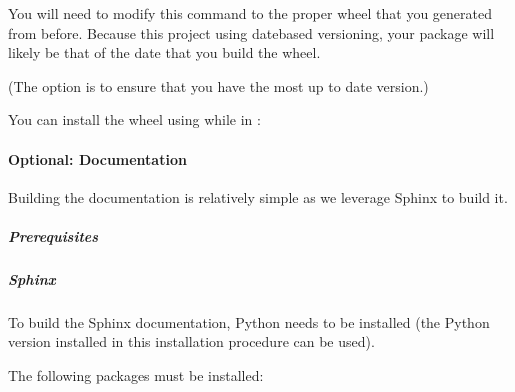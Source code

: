\documentclass[letterpaper,11pt,english]{sphinxmanual}
\begin{document}
\sphinxAtStartPar
You will need to modify this command to the proper wheel that you generated
from before. Because this project using date\sphinxhyphen{}based versioning, your package
will likely be that of the date that you build the wheel.

\sphinxAtStartPar
(The  option is to ensure that you have the most up to date
version.)

\sphinxAtStartPar
You can install the wheel using while in :

\begin{sphinxVerbatim}[commandchars=\\\{\}]
   
\end{sphinxVerbatim}

\sphinxstepscope


\paragraph{Optional: Documentation}
\label{\detokenize{technical/installation/documentation:optional-documentation}}\label{\detokenize{technical/installation/documentation:technical-installation-documentation}}\label{\detokenize{technical/installation/documentation::doc}}
\sphinxAtStartPar
Building the documentation is relatively simple as we leverage Sphinx to
build it.


\subparagraph{Prerequisites}
\label{\detokenize{technical/installation/documentation:prerequisites}}

\subparagraph{Sphinx}
\label{\detokenize{technical/installation/documentation:sphinx}}
\sphinxAtStartPar
To build the Sphinx documentation, Python needs to be installed (the Python
version installed in this installation procedure can be used).

\sphinxAtStartPar
The following packages must be installed:

\begin{sphinxVerbatim}[commandchars=\\\{\}]
   
\end{sphinxVerbatim}
\end{document}
